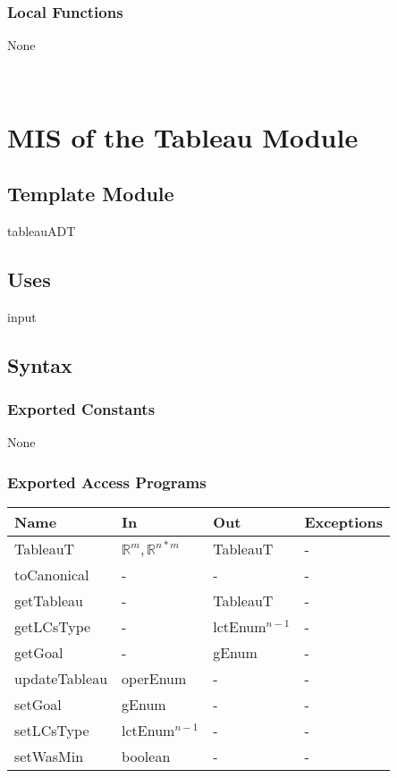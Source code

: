 \documentclass[12pt, titlepage]{article}
\begin{document}
\subsubsection{Local Functions}

None

~\newpage

\section{MIS of the Tableau Module} \label{M_Tableau} 

\subsection{Template Module}

tableauADT

\subsection{Uses}

input

\subsection{Syntax}

\subsubsection{Exported Constants}

None

\subsubsection{Exported Access Programs}

\begin{center}
	\begin{tabular}{p{3cm} p{3cm} p{4cm} p{4cm}}
		\hline
		\textbf{Name} & \textbf{In} & \textbf{Out} & \textbf{Exceptions} \\
		\hline
		TableauT & $\mathbb{R}^m,\mathbb{R}^{n*m}$ & TableauT & - \\
		toCanonical & - & - & - \\
		getTableau & - & TableauT & - \\
		getLCsType & - & lctEnum$^{n-1}$ & - \\
		getGoal & - & gEnum & - \\
		updateTableau & operEnum & - & - \\
		setGoal & gEnum & - & - \\
		setLCsType & lctEnum$^{n-1}$ & - & - \\
		setWasMin & boolean & - & - \\
		\hline
	\end{tabular}
\end{center}
\end{document}
